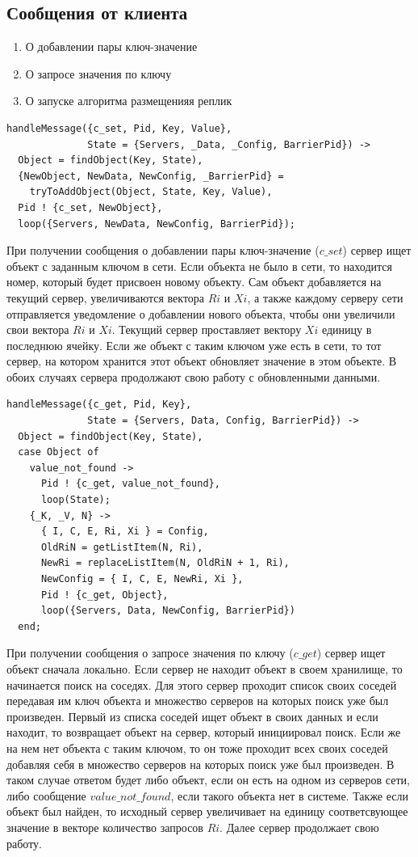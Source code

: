 		\subsection{Сообщения от клиента}
			\begin{enumerate}
				\item О добавлении пары ключ-значение
				\item О запросе значения по ключу
				\item О запуске алгоритма размещенияя реплик	
			\end{enumerate}

			\begin{lstlisting}
handleMessage({c_set, Pid, Key, Value}, 
              State = {Servers, _Data, _Config, BarrierPid}) ->
  Object = findObject(Key, State),
  {NewObject, NewData, NewConfig, _BarrierPid} = 
    tryToAddObject(Object, State, Key, Value),
  Pid ! {c_set, NewObject}, 
  loop({Servers, NewData, NewConfig, BarrierPid});				
			\end{lstlisting}
			При получении сообщения о добавлении пары ключ-значение ($c\_set$) сервер ищет объект с заданным ключом в сети. Если объекта не было в сети, то находится номер, который будет присвоен
			новому объекту. Сам объект добавляется на текущий сервер, увеличиваются вектора $Ri$ и $Xi$, а также каждому серверу сети отправляется уведомление о добавлении нового объекта, чтобы
			они увеличили свои вектора $Ri$ и $Xi$. Текущий сервер проставляет вектору $Xi$ единицу в последнюю ячейку. Если же объект с таким ключом уже есть в сети, то тот сервер, на котором 
			хранится этот объект обновляет значение в этом объекте. В обоих случаях сервера продолжают свою работу с обновленными данными.

			\begin{lstlisting}
handleMessage({c_get, Pid, Key}, 
              State = {Servers, Data, Config, BarrierPid}) ->
  Object = findObject(Key, State),
  case Object of 
    value_not_found ->
      Pid ! {c_get, value_not_found},
      loop(State);
    {_K, _V, N} ->
      { I, C, E, Ri, Xi } = Config,    
      OldRiN = getListItem(N, Ri),
      NewRi = replaceListItem(N, OldRiN + 1, Ri),
      NewConfig = { I, C, E, NewRi, Xi },
      Pid ! {c_get, Object},
      loop({Servers, Data, NewConfig, BarrierPid})
  end;				
			\end{lstlisting}
			При получении сообщения о запросе значения по ключу ($c\_get$) сервер ищет объект сначала локально. Если сервер не находит объект в своем хранилище, то начинается поиск на соседях. 
			Для этого сервер проходит список своих соседей передавая им ключ объекта и множество серверов на которых поиск уже был произведен. Первый из списка соседей ищет объект в своих данных
			и если находит, то возвращает объект на сервер, который инициировал поиск. Если же на нем нет объекта с таким ключом, то он тоже проходит всех своих соседей добавляя себя в множество
			серверов на которых поиск уже был произведен. В таком случае ответом будет либо объект, если он есть на одном из серверов сети, либо сообщение $value\_not\_found$, если такого объекта 
			нет в системе. Также если объект был найден, то исходный сервер увеличивает на единицу соответсвующее значение в векторе количество запросов $Ri$. Далее сервер продолжает свою работу.

